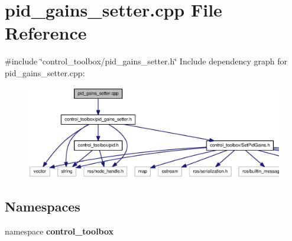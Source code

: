 \section{pid\-\_\-gains\-\_\-setter.\-cpp \-File \-Reference}
\label{pid__gains__setter_8cpp}
{\ttfamily \#include \char`\"{}control\-\_\-toolbox/pid\-\_\-gains\-\_\-setter.\-h\char`\"{}}\*
\-Include dependency graph for pid\-\_\-gains\-\_\-setter.\-cpp\-:
\nopagebreak
\begin{figure}[H]
\begin{center}
\leavevmode
\includegraphics[width=350pt]{pid__gains__setter_8cpp__incl}
\end{center}
\end{figure}
\subsection*{\-Namespaces}
\begin{DoxyCompactItemize}
\item 
namespace {\bf control\-\_\-toolbox}
\end{DoxyCompactItemize}
